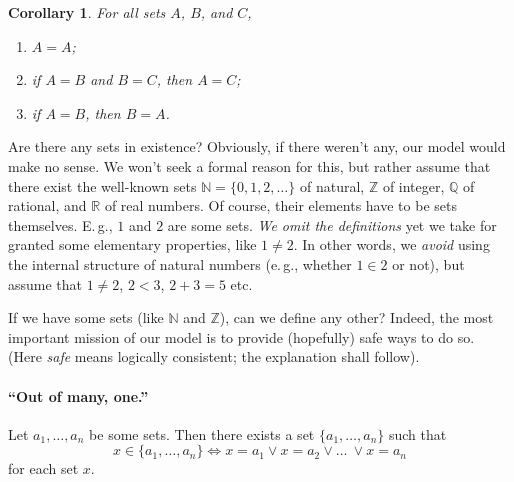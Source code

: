 \documentclass[12pt,notitlepage]{article}
\theoremstyle{plain}
\newtheorem{corr}[thm]{Corollary}
\theoremstyle{definition}
\theoremstyle{plain}
\newcommand{\N}{\mathbb{N}}
\newcommand{\Z}{\mathbb{Z}}
\newcommand{\Q}{\mathbb{Q}}
\newcommand{\R}{\mathbb{R}}
\newcommand{\void}{\varnothing}
\newcommand{\1}{\mathbf{1}}
\newcommand{\0}{\mathbf{0}}
\newcommand{\mcomm}[1]{}
\begin{document}
\begin{corr}\label{ch0:id}
For all sets $A$, $B$, and $C$,
\begin{enumerate}
\item $A = A$;
\item if $A = B$ and $B = C$, then $A = C$;
\item if $A = B$, then $B = A$.
\end{enumerate}
\end{corr}

Are there any sets in existence? Obviously, if there weren't any, our model would make no sense. We won't seek a formal reason for this, but rather assume that there exist the well-known sets $\N = \{0,1,2,\ldots \}$ of natural, $\Z$ of integer, $\Q$ of rational, and $\R$ of real numbers. Of course, their elements have to be sets themselves. E.\,g., $1$ and $2$ are some sets. \emph{We omit the definitions} yet we take for granted some elementary properties, like $1 \neq 2$. In other words, we \emph{avoid} using the internal structure of natural numbers (e.\,g., whether $1 \in 2$ or not), but assume that $1 \neq 2$, $2 < 3$, $2 + 3 = 5$ etc.

\mcomm{I usually tell the students that from the standard definition of $\N$ it follows that $0 = \void$ and $n + 1 = \{0,1,\ldots,n\}$ for each $n$; then I ask them not to use these equations in their proofs since we currently have no means to make this \emph{recursive} `definition' rigorous. 
\medskip\\
When solving class problems, the Instructor should warn the students against making their examples dependent on whether $3 \neq \{ 4 \}$ etc. They had better look for \emph{simpler} examples based on sets whose elements are known for sure, like $\void$, $\{ \void \}$, etc.}

If we have some sets (like $\N$ and $\Z$), can we define any other? Indeed, the most important mission of our model is to provide (hopefully) safe ways to do so. (Here \emph{safe} means logically consistent; the explanation shall follow).

\paragraph{``Out of many, one.''} Let $a_1,\ldots,a_n$ be some sets. Then there exists a set $\{a_1,\ldots,a_n \}$ such that
$$x \in \{a_1,\ldots,a_n\} \iff x = a_1 \vee x = a_2 \vee \ldots\ \vee x = a_n$$
for each set $x$.
\end{document}
